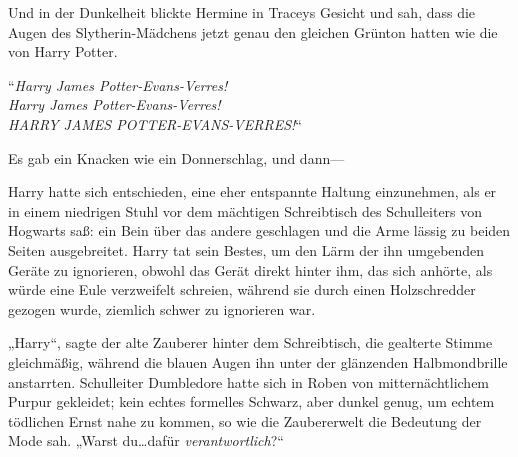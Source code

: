 Und in der Dunkelheit blickte Hermine in Traceys Gesicht und sah, dass die Augen des Slytherin-Mädchens jetzt genau den gleichen Grünton hatten wie die von Harry Potter.

“\emph{Harry James Potter-Evans-Verres!\\
Harry James Potter-Evans-Verres!\\
HARRY JAMES POTTER-EVANS-VERRES!}“

Es gab ein Knacken wie ein Donnerschlag, und dann—

\later

Harry hatte sich entschieden, eine eher entspannte Haltung einzunehmen, als er in einem niedrigen Stuhl vor dem mächtigen Schreibtisch des Schulleiters von Hogwarts saß: ein Bein über das andere geschlagen und die Arme lässig zu beiden Seiten ausgebreitet. Harry tat sein Bestes, um den Lärm der ihn umgebenden Geräte zu ignorieren, obwohl das Gerät direkt hinter ihm, das sich anhörte, als würde eine Eule verzweifelt schreien, während sie durch einen Holzschredder gezogen wurde, ziemlich schwer zu ignorieren war.

„Harry“, sagte der alte Zauberer hinter dem Schreibtisch, die gealterte Stimme gleichmäßig, während die blauen Augen ihn unter der glänzenden Halbmondbrille anstarrten. Schulleiter Dumbledore hatte sich in Roben von mitternächtlichem Purpur gekleidet; kein echtes formelles Schwarz, aber dunkel genug, um echtem tödlichen Ernst nahe zu kommen, so wie die Zaubererwelt die Bedeutung der Mode sah.
„Warst du…dafür \emph{verantwortlich}?“

